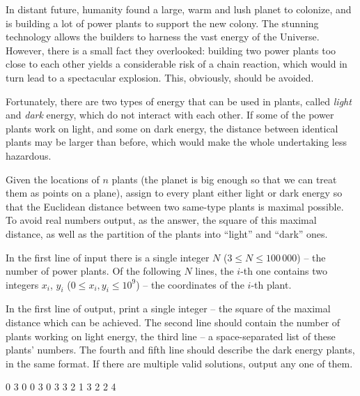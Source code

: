 





In distant future, humanity found a large, warm and lush planet to colonize, and is building a lot of power plants to support the new colony. The stunning technology allows the builders to harness the vast energy of the Universe. However, there is a small fact they overlooked: building two power plants too close to each other yields a considerable risk of a chain reaction, which would in turn lead to a spectacular explosion. This, obviously, should be avoided.

Fortunately, there are two types of energy that can be used in plants, called \textit{light} and \textit{dark} energy, which do not interact with each other. If some of the power plants work on light, and some on dark energy, the distance between identical plants may be larger than before, which would make the whole undertaking less hazardous.




Given the locations of $n$ plants (the planet is big enough so that we can treat them as points on a plane), assign to every plant either light or dark energy so that the Euclidean distance between two same-type plants is maximal possible. To avoid real numbers output, as the answer, the square of this maximal distance, as well as the partition of the plants into ``light'' and ``dark'' ones.


In the first line of input there is a single integer $N$ ($3 \leq N \leq 100\,000$) -- the number of power plants.
Of the following $N$ lines, the $i$-th one contains two integers $x_i$, $y_i$ ($0 \leq x_i, y_i \leq 10^9$) -- the coordinates of the $i$-th plant.


In the first line of output, print a single integer -- the square of the maximal distance which can be achieved. The second line should contain the number of plants working on light energy, the third line -- a space-separated list of these plants' numbers. The fourth and fifth line should describe the dark energy plants, in the same format. If there are multiple valid solutions, output any one of them.



0 3
0 0
3 0
3 3
2
1 3
2
2 4
\sampleCOMMENT
\sampleEND




